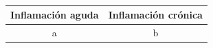 \begin{table}
\centering
\caption{}
\label{tab:}
\begin{threeparttable}
{
\begin{tabular}{cc}\hline

    \textbf{Inflamación aguda} & \textbf{Inflamación crónica} \\ \hline
    
    a & b & \\
    
    \hline
\end{tabular}
}
\begin{tablenotes} %
    \item[] 
\end{tablenotes}
\end{threeparttable}
\end{table}